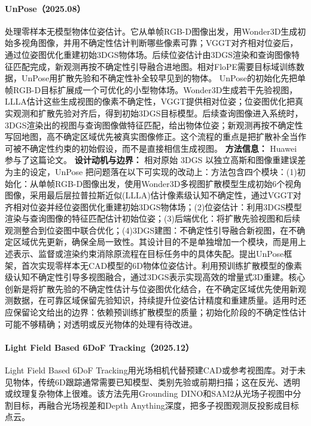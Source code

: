\paragraph{UnPose（2025.08）\cite{2508_15972}}
处理零样本无模型物体位姿估计。它从单帧RGB-D图像出发，用Wonder3D生成初始多视角图像，并用不确定性估计判断哪些像素可靠；VGGT对齐相对位姿后，通过位姿图优化重建初始3DGS物体场。后续位姿估计由3DGS渲染和查询图像特征匹配完成，新观测再按不确定性引导融合进地图。相对FloPE需要目标域训练数据，UnPose用扩散先验和不确定性补全较早见到的物体。
UnPose的初始化先把单帧RGB-D目标扩展成一个可优化的小型物体场。Wonder3D生成若干先验视图，LLLA估计这些生成视图的像素不确定性，VGGT提供相对位姿；位姿图优化把真实观测和扩散先验对齐后，得到初始3DGS目标模型。后续查询图像进入系统时，3DGS渲染出的视图与查询图像做特征匹配，给出物体位姿；新观测再按不确定性写回地图，高不确定区域优先被真实图像修正。这个流程的重点是把扩散补全当作可被不确定性约束的初始假设，而不是直接相信生成视图。
\textbf{方法信息：} Huawei 参与了这篇论文。
\textbf{设计动机与边界：} 相对原始 3DGS 以独立高斯和图像重建误差为主的设定，UnPose 把问题落在以下可实现的改动上：方法包含四个模块：(1)初始化：从单帧RGB-D图像出发，使用Wonder3D多视图扩散模型生成初始6个视角图像，采用最后层拉普拉斯近似(LLLA)估计像素级认知不确定性，通过VGGT对齐相对位姿并经位姿图优化重建初始3DGS物体场；(2)位姿估计：利用3DGS模型渲染与查询图像的特征匹配估计初始位姿；(3)后端优化：将扩散先验视图和后续观测整合到位姿图中联合优化；(4)3DGS建图：不确定性引导融合新视图，在不确定区域优先更新，确保全局一致性。其设计目的不是单独增加一个模块，而是用上述表示、监督或渲染约束消除原流程在目标任务中的具体失配。提出UnPose框架，首次实现零样本无CAD模型的6D物体位姿估计。利用预训练扩散模型的像素级认知不确定性引导多视图融合，通过3DGS表示实现高效的增量式3D重建。核心创新是将扩散先验的不确定性估计与位姿图优化结合，在不确定区域优先使用新观测数据，在可靠区域保留先验知识，持续提升位姿估计精度和重建质量。适用时还应保留论文给出的边界：依赖预训练扩散模型的质量；初始化阶段的不确定性估计可能不够精确；对透明或反光物体的处理有待改进。
\paragraph{Light Field Based 6DoF Tracking（2025.12）\cite{2512_13007}}
Light Field Based 6DoF Tracking用光场相机代替预建CAD或参考视图库。对于未见物体，传统6D跟踪通常需要已知模型、类别先验或前期扫描；这在反光、透明或纹理复杂物体上很难。该方法先用Grounding DINO和SAM2从光场子视图中分割目标，再融合光场视差和Depth Anything深度，把多子视图观测反投影成目标点云。


